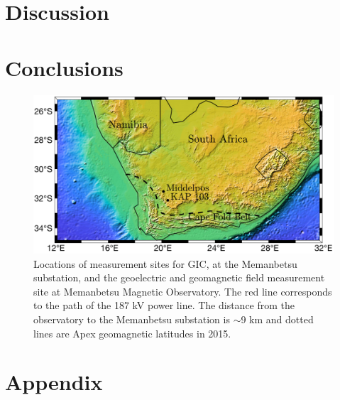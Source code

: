 \documentclass[draft,linenumbers]{agujournal2018}
\begin{document}
\section{Discussion}
\label{Discussion}

\section{Conclusions}

\begin{figure}[h]
  \centering
  \includegraphics[width=\textwidth]{figures/map.pdf}
  \caption{Locations of measurement sites for GIC, at the Memanbetsu substation, and the geoelectric and geomagnetic field measurement site at Memanbetsu Magnetic Observatory. The red line corresponds to the path of the 187 kV power line. The distance from the observatory to the Memanbetsu substation is $\sim$9 km and dotted lines are Apex geomagnetic latitudes \citep{Richmond1995} in 2015.}
  \label{map}
\end{figure}

\clearpage

\section{Appendix}
\end{document}
